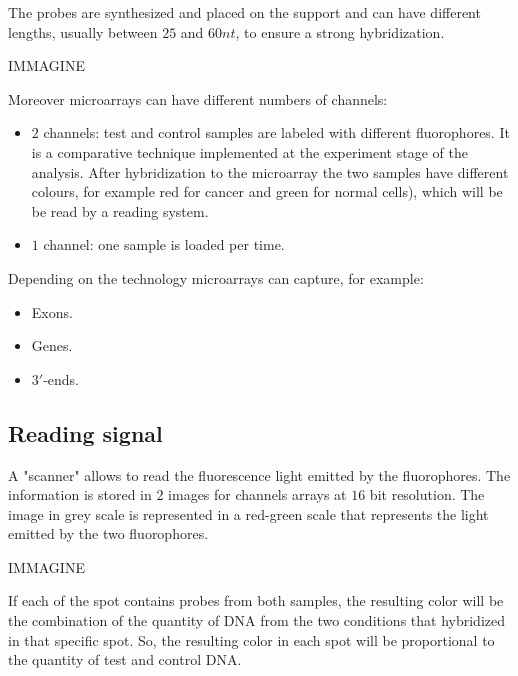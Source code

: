 	The probes are synthesized and placed on the support and can have different lengths, usually between $25$ and $60nt$, to ensure a strong hybridization.

	\begin{center}
		IMMAGINE
	\end{center}

	Moreover microarrays can have different numbers of channels:

	\begin{multicols}{2}
		\begin{itemize}
			\item $2$ channels: test and control samples are labeled with different fluorophores.
				It is a comparative technique implemented at the experiment stage of the analysis.
				After hybridization to the microarray the two samples have different colours, for example red for cancer and green for normal cells), which will be be read by a reading system.
			\item $1$ channel: one sample is loaded per time.
		\end{itemize}
	\end{multicols}

	Depending on the technology microarrays can capture, for example:

	\begin{multicols}{3}
		\begin{itemize}
			\item Exons.
			\item Genes.
			\item $3'$-ends.
		\end{itemize}
	\end{multicols}

	\subsection{Reading signal}
	A "scanner" allows to read the fluorescence light emitted by the fluorophores.
	The information is stored in $2$ images for channels arrays at $16$ bit resolution.
	The image in grey scale is represented in a red-green scale that represents the light emitted by the two fluorophores.

	\begin{center}
		IMMAGINE
	\end{center}

	If each of the spot contains probes from both samples, the resulting color will be the combination of the quantity of DNA from the two conditions that hybridized in that specific spot.
	So, the resulting color in each spot will be proportional to the quantity of test and control DNA.

